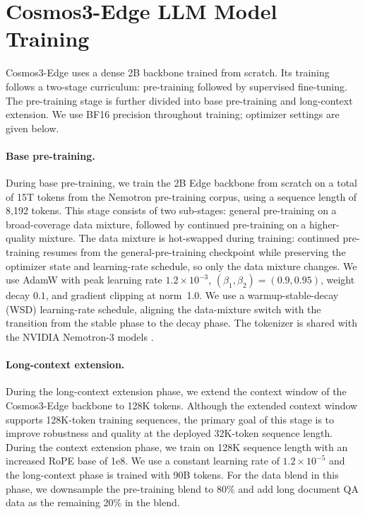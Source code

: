 \section{Cosmos3-Edge LLM Model Training}
\label{app:training_edge}

Cosmos3-Edge uses a dense 2B backbone trained from scratch. Its training follows a two-stage curriculum: pre-training followed by supervised fine-tuning. The pre-training stage is further divided into base pre-training and long-context extension. We use BF16 precision throughout training; optimizer settings are given below.

\paragraph{Base pre-training.}
During base pre-training, we train the 2B Edge backbone from scratch on a total of 15T tokens from the Nemotron pre-training corpus, using a sequence length of 8,192 tokens. This stage consists of two sub-stages: general pre-training on a broad-coverage data mixture, followed by continued pre-training on a higher-quality mixture. The data mixture is hot-swapped during training: continued pre-training resumes from the general-pre-training checkpoint while preserving the optimizer state and learning-rate schedule, so only the data mixture changes. We use AdamW with peak learning rate $1.2\times 10^{-3}$, $(\beta_1,\beta_2)=(0.9,0.95)$, weight decay $0.1$, and gradient clipping at norm~1.0. We use a warmup-stable-decay (WSD) learning-rate schedule, aligning the data-mixture switch with the transition from the stable phase to the decay phase. The tokenizer is shared with the NVIDIA Nemotron-3 models \citep{nemotron3-family}.

\paragraph{Long-context extension.}
During the long-context extension phase, we extend the context window of the Cosmos3-Edge backbone to 128K tokens. Although the extended context window supports 128K-token training sequences, the primary goal of this stage is to improve robustness and quality at the deployed 32K-token sequence length. During the context extension phase, we train on 128K sequence length with an increased RoPE base of 1e8. We use a constant learning rate of $1.2\times 10^{-5}$ and the long-context phase is trained with 90B tokens. For the data blend in this phase, we downsample the pre-training blend to 80\% and add long document QA data as the remaining 20\% in the blend.

